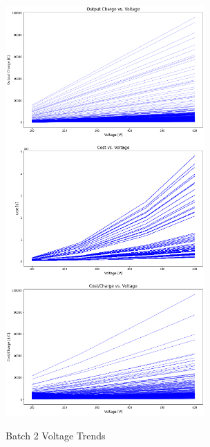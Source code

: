 \begin{figure}
    \begin{center}
    \includegraphics[width=3in]{fig21.png}
    \end{center}
    \renewcommand{\baselinestretch}{1}
    \small\normalsize
    \begin{quote}
    \caption[Batch 2 Voltage Trends]{Batch 2 Voltage Trends} \label{fig: f21}
    \end{quote}
\end{figure}

